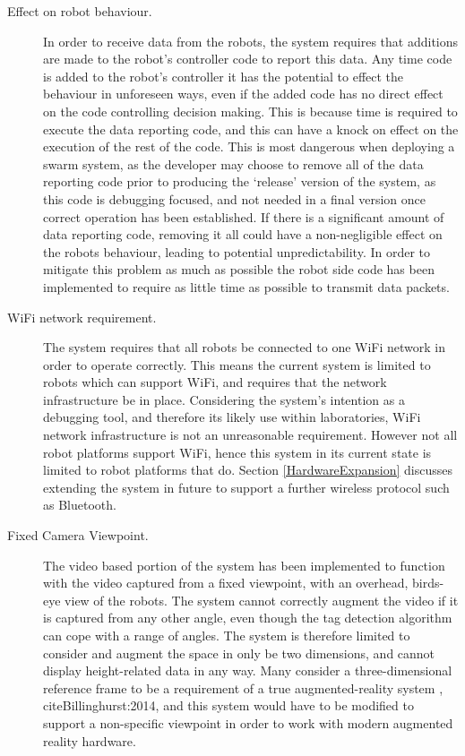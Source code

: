 \begin{description}
 \item [Effect on robot behaviour.] In order to receive data from the robots, the system requires that   additions are made to the robot's controller code to report this data. Any time code is added to the robot's controller it has the potential to effect the behaviour in unforeseen ways, even if the added code has no direct effect on the code controlling decision making. This is because time is required to execute the data reporting code, and this can have a knock on effect on the execution of the rest of the code. This is most dangerous when deploying a swarm system, as the developer may choose to remove all of the data reporting code prior to producing the `release' version of the system, as this code is debugging focused, and not needed in a final version once correct operation has been established. If there is a significant amount of data reporting code, removing it all could have a non-negligible effect on the robots behaviour, leading to potential unpredictability. In order to mitigate this problem as much as possible the robot side code has been implemented to require as little time as possible to transmit data packets.
 
\item [WiFi network requirement.] The system requires that all robots be connected to one WiFi network in order to operate correctly. This means the current system is limited to robots which can support WiFi, and requires that the network infrastructure be in place. Considering the system's intention as a debugging tool, and therefore its likely use within laboratories, WiFi network infrastructure is not an unreasonable requirement. However not all robot platforms support WiFi, hence this system in its current state is limited to robot platforms that do. Section \ref{HardwareExpansion} discusses extending the system in future to support a further wireless protocol such as Bluetooth.

\item [Fixed Camera Viewpoint.] The video based portion of the system has been implemented to function with the video captured from a fixed viewpoint, with an overhead, birds-eye view of the robots. The system cannot correctly augment the video if it is captured from any other angle, even though the tag detection algorithm can cope with a range of angles. The system is therefore limited to consider and augment the space in only be two dimensions, and cannot display height-related data in any way. Many consider a three-dimensional reference frame to be a requirement of a true augmented-reality system \cite{Azuma:1997}, cite{Billinghurst:2014}, and this system would have to be modified to support a non-specific viewpoint in order to work with modern augmented reality hardware.
\end{description}

